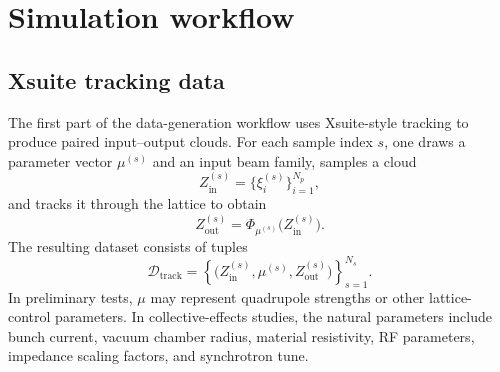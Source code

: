 \documentclass[11pt,a4paper]{article}
\begin{document}
\begin{sloppypar}
\section{Simulation workflow}
\subsection{Xsuite tracking data}
The first part of the data-generation workflow uses Xsuite-style tracking to produce paired input--output clouds. For each sample index $s$, one draws a parameter vector $\mu^{(s)}$ and an input beam family, samples a cloud
\begin{equation}
    Z_{\mathrm{in}}^{(s)}=\{\xi_i^{(s)}\}_{i=1}^{N_p},
\end{equation}
and tracks it through the lattice to obtain
\begin{equation}
    Z_{\mathrm{out}}^{(s)}=\Phi_{\mu^{(s)}}\big(Z_{\mathrm{in}}^{(s)}\big).
\end{equation}
The resulting dataset consists of tuples
\begin{equation}
    \mathcal{D}_{\mathrm{track}}=\left\{\big(Z_{\mathrm{in}}^{(s)},\mu^{(s)},Z_{\mathrm{out}}^{(s)}\big)\right\}_{s=1}^{N_s}.
    \label{eq:tracking_dataset_revised}
\end{equation}
In preliminary tests, $\mu$ may represent quadrupole strengths or other lattice-control parameters. In collective-effects studies, the natural parameters include bunch current, vacuum chamber radius, material resistivity, RF parameters, impedance scaling factors, and synchrotron tune.


\end{sloppypar}
\end{document}
